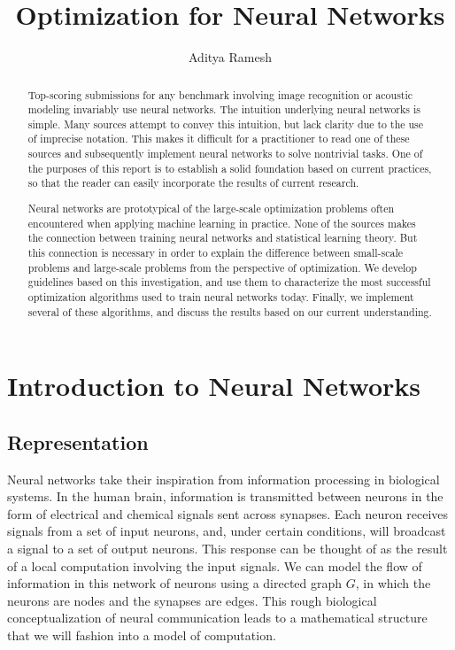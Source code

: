 \documentclass[11pt,a4paper]{article}
\title{Optimization for Neural Networks}
\author{Aditya Ramesh}
\date{}
\numberwithin{equation}{section}
\begin{document}
\maketitle
\begin{abstract}
Top-scoring submissions for any benchmark involving image recognition or
acoustic modeling invariably use neural networks. The intuition underlying
neural networks is simple. Many sources attempt to convey this intuition, but
lack clarity due to the use of imprecise notation. This makes it difficult for a
practitioner to read one of these sources and subsequently implement neural
networks to solve nontrivial tasks. One of the purposes of this report is to
establish a solid foundation based on current practices, so that the reader can
easily incorporate the results of current research.

Neural networks are prototypical of the large-scale optimization problems often
encountered when applying machine learning in practice. None of the sources
makes the connection between training neural networks and statistical learning
theory. But this connection is necessary in order to explain the difference
between small-scale problems and large-scale problems from the perspective of
optimization. We develop guidelines based on this investigation, and use them to
characterize the most successful optimization algorithms used to train neural
networks today. Finally, we implement several of these algorithms, and discuss
the results based on our current understanding.
\end{abstract}

\section{Introduction to Neural Networks}
\subsection{Representation}
\label{sec:representation}

Neural networks take their inspiration from information processing in biological
systems. In the human brain, information is transmitted between neurons in the
form of electrical and chemical signals sent across synapses. Each neuron
receives signals from a set of input neurons, and, under certain conditions,
will broadcast a signal to a set of output neurons. This response can be thought
of as the result of a local computation involving the input signals. We can
model the flow of information in this network of neurons using a directed graph
$G$, in which the neurons are nodes and the synapses are edges. This rough
biological conceptualization of neural communication leads to a mathematical
structure that we will fashion into a model of computation.
\end{document}

